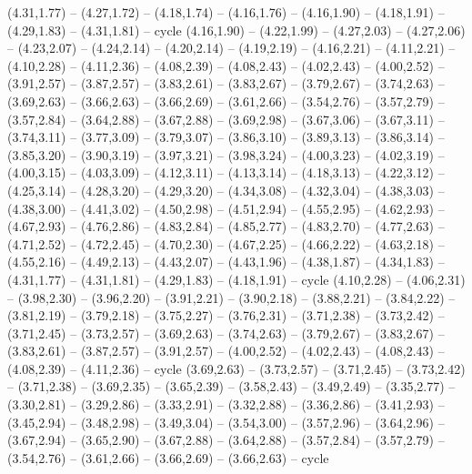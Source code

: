 \expandafter\def\csname geo:gebiet:URY\endcsname{
  (4.31,1.77) -- (4.27,1.72) -- (4.18,1.74) -- (4.16,1.76) -- (4.16,1.90) -- (4.18,1.91) -- (4.29,1.83) -- (4.31,1.81) -- cycle}
\expandafter\def\csname geo:gebiet:BRA\endcsname{
  (4.16,1.90) -- (4.22,1.99) -- (4.27,2.03) -- (4.27,2.06) -- (4.23,2.07) -- (4.24,2.14) -- (4.20,2.14) -- (4.19,2.19) -- (4.16,2.21) -- (4.11,2.21) -- (4.10,2.28) -- (4.11,2.36) -- (4.08,2.39) -- (4.08,2.43) -- (4.02,2.43) -- (4.00,2.52) -- (3.91,2.57) -- (3.87,2.57) -- (3.83,2.61) -- (3.83,2.67) -- (3.79,2.67) -- (3.74,2.63) -- (3.69,2.63) -- (3.66,2.63) -- (3.66,2.69) -- (3.61,2.66) -- (3.54,2.76) -- (3.57,2.79) -- (3.57,2.84) -- (3.64,2.88) -- (3.67,2.88) -- (3.69,2.98) -- (3.67,3.06) -- (3.67,3.11) -- (3.74,3.11) -- (3.77,3.09) -- (3.79,3.07) -- (3.86,3.10) -- (3.89,3.13) -- (3.86,3.14) -- (3.85,3.20) -- (3.90,3.19) -- (3.97,3.21) -- (3.98,3.24) -- (4.00,3.23) -- (4.02,3.19) -- (4.00,3.15) -- (4.03,3.09) -- (4.12,3.11) -- (4.13,3.14) -- (4.18,3.13) -- (4.22,3.12) -- (4.25,3.14) -- (4.28,3.20) -- (4.29,3.20) -- (4.34,3.08) -- (4.32,3.04) -- (4.38,3.03) -- (4.38,3.00) -- (4.41,3.02) -- (4.50,2.98) -- (4.51,2.94) -- (4.55,2.95) -- (4.62,2.93) -- (4.67,2.93) -- (4.76,2.86) -- (4.83,2.84) -- (4.85,2.77) -- (4.83,2.70) -- (4.77,2.63) -- (4.71,2.52) -- (4.72,2.45) -- (4.70,2.30) -- (4.67,2.25) -- (4.66,2.22) -- (4.63,2.18) -- (4.55,2.16) -- (4.49,2.13) -- (4.43,2.07) -- (4.43,1.96) -- (4.38,1.87) -- (4.34,1.83) -- (4.31,1.77) -- (4.31,1.81) -- (4.29,1.83) -- (4.18,1.91) -- cycle}
\expandafter\def\csname geo:gebiet:BOL\endcsname{
  (4.10,2.28) -- (4.06,2.31) -- (3.98,2.30) -- (3.96,2.20) -- (3.91,2.21) -- (3.90,2.18) -- (3.88,2.21) -- (3.84,2.22) -- (3.81,2.19) -- (3.79,2.18) -- (3.75,2.27) -- (3.76,2.31) -- (3.71,2.38) -- (3.73,2.42) -- (3.71,2.45) -- (3.73,2.57) -- (3.69,2.63) -- (3.74,2.63) -- (3.79,2.67) -- (3.83,2.67) -- (3.83,2.61) -- (3.87,2.57) -- (3.91,2.57) -- (4.00,2.52) -- (4.02,2.43) -- (4.08,2.43) -- (4.08,2.39) -- (4.11,2.36) -- cycle}
\expandafter\def\csname geo:gebiet:PER\endcsname{
  (3.69,2.63) -- (3.73,2.57) -- (3.71,2.45) -- (3.73,2.42) -- (3.71,2.38) -- (3.69,2.35) -- (3.65,2.39) -- (3.58,2.43) -- (3.49,2.49) -- (3.35,2.77) -- (3.30,2.81) -- (3.29,2.86) -- (3.33,2.91) -- (3.32,2.88) -- (3.36,2.86) -- (3.41,2.93) -- (3.45,2.94) -- (3.48,2.98) -- (3.49,3.04) -- (3.54,3.00) -- (3.57,2.96) -- (3.64,2.96) -- (3.67,2.94) -- (3.65,2.90) -- (3.67,2.88) -- (3.64,2.88) -- (3.57,2.84) -- (3.57,2.79) -- (3.54,2.76) -- (3.61,2.66) -- (3.66,2.69) -- (3.66,2.63) -- cycle}
